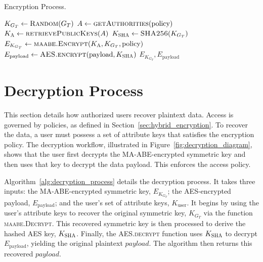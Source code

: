 \documentclass[cic,tc,english]{iiufrgs}
\numberwithin{algorithm}{chapter}
\begin{document}
        \begin{algorithm}[h]
            \caption{Encryption Process.}
            \label{alg:encryption_process}
            \begin{algorithmic}[1]
                \State $K_{G_T} \gets \textsc{Random}(G_T)$
                \State $A \gets \textsc{getAuthorities}(\text{policy})$
                \State $K_{\textsc{A}} \gets \textsc{retrievePublicKeys}(A)$
                \State $K_{\textsc{SHA}} \gets \textsc{SHA256}(K_{G_T})$
                \State $E_{K_{G_T}} \gets \textsc{maabe.Encrypt}(K_{\textsc{A}}, K_{G_T}, \text{policy})$
                \State $E_{\text{payload}} \gets \textsc{AES.encrypt}(\text{payload}, K_{\textsc{SHA}})$
                \State \Return $E_{K_{G_T}}, E_{\text{payload}}$
            \EndProcedure
            \end{algorithmic}
        \end{algorithm}

    \section{Decryption Process}
        \label{sec:policy_decryption}

        This section details how authorized users recover plaintext data. Access is governed by policies, as defined in Section~\ref{sec:hybrid_encryption}. To recover the data, a user must possess a set of attribute keys that satisfies the encryption policy. The decryption workflow, illustrated in Figure~\ref{fig:decryption_diagram}, shows that the user first decrypts the MA-ABE-encrypted symmetric key and then uses that key to decrypt the data payload. This enforces the access policy. 

        Algorithm~\ref{alg:decryption_process} details the decryption process. It takes three inputs: the MA-ABE-encrypted symmetric key, $E_{K_{G_T}}$; the AES-encrypted payload, $E_{\text{payload}}$; and the user's set of attribute keys, $K_{\text{user}}$. It begins by using the user's attribute keys to recover the original symmetric key, $K_{G_T}$ via the function \textsc{maabe.Decrypt}. This recovered symmetric key is then processed to derive the hashed AES key, $K_{\textsc{SHA}}$. Finally, the \textsc{AES.decrypt} function uses $K_{\textsc{SHA}}$ to decrypt $E_{\text{payload}}$, yielding the original plaintext $payload$. The algorithm then returns this recovered $payload$.
\end{document}
